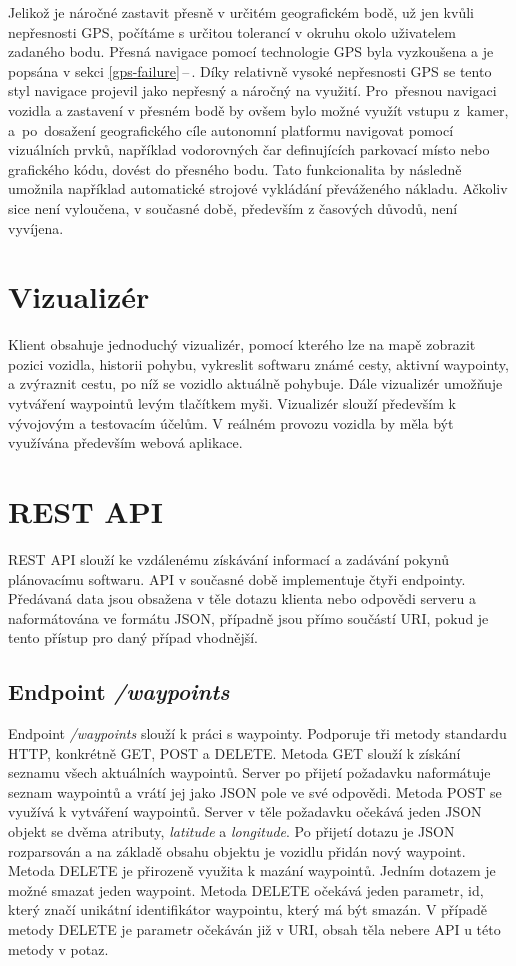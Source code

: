 \documentclass[czech, bachelor]{diploma}
\newcommand{\filipref}[1]{\ref{#1}\,--\,\nameref{#1}}
\begin{document}
Jelikož je náročné zastavit přesně v určitém geografickém bodě, už jen kvůli nepřesnosti GPS, počítáme s určitou tolerancí
v okruhu okolo uživatelem zadaného bodu. Přesná navigace pomocí technologie GPS byla vyzkoušena a je popsána v sekci
\filipref{gps-failure}. Díky relativně vysoké nepřesnosti GPS se tento styl navigace projevil jako nepřesný a náročný na využití.
Pro~přesnou navigaci vozidla a zastavení v přesném bodě by ovšem bylo možné využít vstupu z~kamer, a~po~dosažení geografického
cíle autonomní platformu navigovat pomocí vizuálních prvků, například vodorovných čar definujících parkovací místo nebo
grafického kódu, dovést do přesného bodu. Tato funkcionalita by následně umožnila například automatické strojové vykládání
převáženého nákladu. Ačkoliv sice není vyloučena, v současné době, především z časových důvodů, není vyvíjena.

\section{Vizualizér} \label{visualizer}

Klient obsahuje jednoduchý vizualizér, pomocí kterého lze na mapě zobrazit pozici vozidla, historii pohybu, vykreslit
softwaru známé cesty, aktivní waypointy, a zvýraznit cestu, po níž se vozidlo aktuálně pohybuje. Dále vizualizér umožňuje
vytváření waypointů levým tlačítkem myši. Vizualizér slouží především k vývojovým a testovacím účelům. V reálném provozu vozidla
by měla být využívána především webová aplikace.

\section{REST API} \label{rest-api}

REST API slouží ke vzdálenému získávání informací a zadávání pokynů plánovacímu softwaru. API v současné době implementuje čtyři
endpointy. Předávaná data jsou obsažena v těle dotazu klienta nebo odpovědi serveru a naformátována ve formátu JSON, případně jsou
přímo součástí URI, pokud je tento přístup pro daný případ vhodnější.

\subsection{Endpoint \emph{/waypoints}}

Endpoint \emph{/waypoints} slouží k práci s waypointy. Podporuje tři metody standardu HTTP, konkrétně GET, POST a DELETE.  Metoda
GET slouží k získání seznamu všech aktuálních waypointů. Server po přijetí požadavku naformátuje seznam waypointů a vrátí jej jako
JSON pole ve své odpovědi. Metoda POST se využívá k vytváření waypointů. Server v těle požadavku očekává jeden JSON objekt se
dvěma atributy, \emph{latitude} a \emph{longitude}. Po přijetí dotazu je JSON rozparsován a na základě obsahu objektu je vozidlu
přidán nový waypoint. Metoda DELETE je přirozeně využita k mazání waypointů. Jedním dotazem je možné smazat jeden waypoint. Metoda
DELETE očekává jeden parametr, id, který značí unikátní identifikátor waypointu, který má být smazán. V případě metody DELETE
je parametr očekáván již v URI, obsah těla nebere API u této metody v potaz.
\end{document}
